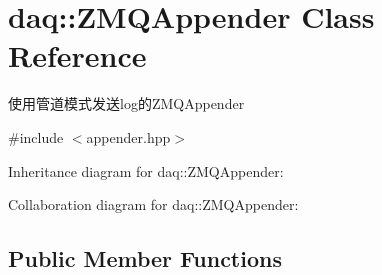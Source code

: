 \hypertarget{classdaq_1_1ZMQAppender}{}\section{daq\+:\+:Z\+M\+Q\+Appender Class Reference}
\label{classdaq_1_1ZMQAppender}


使用管道模式发送log的\+Z\+M\+Q\+Appender  




{\ttfamily \#include $<$appender.\+hpp$>$}



Inheritance diagram for daq\+:\+:Z\+M\+Q\+Appender\+:


Collaboration diagram for daq\+:\+:Z\+M\+Q\+Appender\+:
\subsection*{Public Member Functions}
